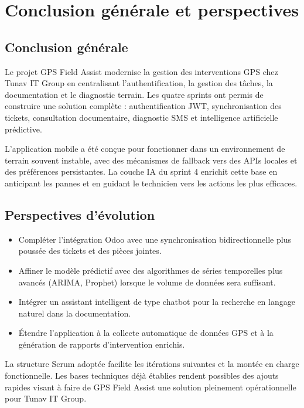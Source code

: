 \documentclass[12pt,a4paper]{report}
\begin{document}
\chapter{Conclusion générale et perspectives}

\section{Conclusion générale}
\noindent Le projet GPS Field Assist modernise la gestion des interventions GPS chez Tunav IT Group en centralisant l'authentification, la gestion des tâches, la documentation et le diagnostic terrain. Les quatre sprints ont permis de construire une solution complète : authentification JWT, synchronisation des tickets, consultation documentaire, diagnostic SMS et intelligence artificielle prédictive.

\noindent L'application mobile a été conçue pour fonctionner dans un environnement de terrain souvent instable, avec des mécanismes de fallback vers des APIs locales et des préférences persistantes. La couche IA du sprint 4 enrichit cette base en anticipant les pannes et en guidant le technicien vers les actions les plus efficaces.

\section{Perspectives d'évolution}
\begin{itemize}
    \item Compléter l'intégration Odoo avec une synchronisation bidirectionnelle plus poussée des tickets et des pièces jointes.
    \item Affiner le modèle prédictif avec des algorithmes de séries temporelles plus avancés (ARIMA, Prophet) lorsque le volume de données sera suffisant.
    \item Intégrer un assistant intelligent de type chatbot pour la recherche en langage naturel dans la documentation.
    \item Étendre l'application à la collecte automatique de données GPS et à la génération de rapports d'intervention enrichis.
\end{itemize}

\noindent La structure Scrum adoptée facilite les itérations suivantes et la montée en charge fonctionnelle. Les bases techniques déjà établies rendent possibles des ajouts rapides visant à faire de GPS Field Assist une solution pleinement opérationnelle pour Tunav IT Group.
\end{document}
